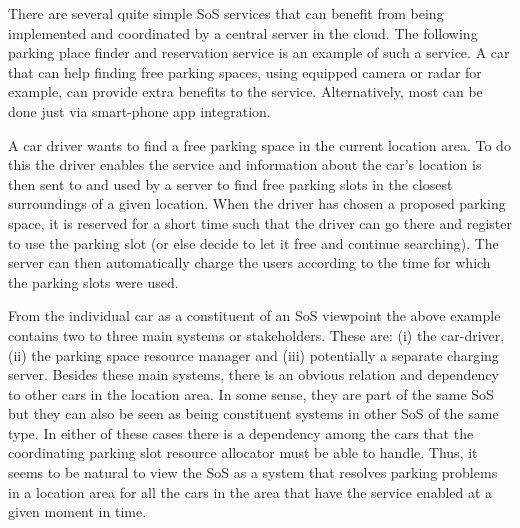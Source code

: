 There are several quite simple SoS services that can benefit from being implemented and coordinated by a central server in the cloud. The following parking place finder and reservation service is an example of such a service. A car that can help finding free parking spaces, using equipped camera or radar for example, can provide extra benefits to the service. Alternatively, most can be done just via smart-phone app integration.

 A car driver wants to find a free parking space in the current location area. To do this the driver enables the service and information about the car's location is then sent to and used by a server to find free parking slots in the closest surroundings of a given location. When the driver has chosen a proposed parking space, it is reserved for a short time such that the driver can go there and register to use the parking slot (or else decide to let it free and continue searching). The server can then automatically charge the users according to the time for which the parking slots were used. %
 
From the individual car as a constituent of an SoS viewpoint the above example contains two to three main systems or stakeholders. These are: (i) the car-driver, (ii) the parking space resource manager and (iii) potentially a separate charging server. Besides these main systems, there is an obvious relation and dependency to other cars in the location area. In some sense, they are part of the same SoS but they can also be seen as being constituent systems in other SoS of the same type. In either of these cases there is a dependency among the cars that the coordinating parking slot resource allocator must be able to handle. Thus, it seems to be natural to view the SoS as a system that resolves parking problems in a location area for all the cars in the area that have the service enabled at a given moment in time.

